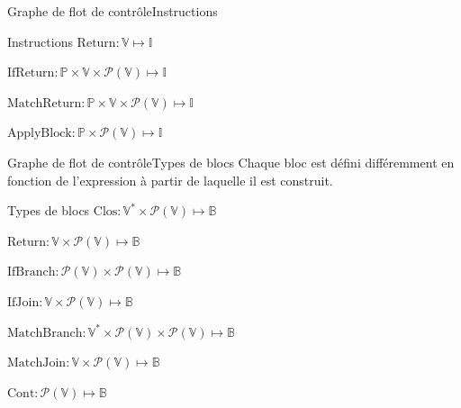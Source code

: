 \documentclass{beamer}
\begin{document}
\begin{frame}{Graphe de flot de contrôle}{Instructions}
\begin{block}{Instructions}
        $\text{Return} : \mathbb{V} \mapsto \mathbb{I}$%

        $\text{IfReturn} : \mathbb{P} \times \mathbb{V} \times \mathcal{P}(\mathbb{V}) \mapsto \mathbb{I}$%

        $\text{MatchReturn} : \mathbb{P} \times \mathbb{V} \times \mathcal{P}(\mathbb{V}) \mapsto \mathbb{I}$%

        $\text{ApplyBlock} : \mathbb{P} \times \mathcal{P}(\mathbb{V}) \mapsto \mathbb{I}$%
    \end{block}
\end{frame}

\begin{frame}{Graphe de flot de contrôle}{Types de blocs}
    Chaque bloc est défini différemment en fonction de l'expression à partir de laquelle il est construit.%
    
    \begin{block}{Types de blocs}
        $\text{Clos} : \mathbb{V}^{*} \times \mathcal{P}(\mathbb{V}) \mapsto \mathbb{B}$%

        $\text{Return} : \mathbb{V} \times \mathcal{P}(\mathbb{V}) \mapsto \mathbb{B}$%

        $\text{IfBranch} : \mathcal{P}(\mathbb{V}) \times \mathcal{P}(\mathbb{V}) \mapsto \mathbb{B}$%

        $\text{IfJoin} : \mathbb{V} \times \mathcal{P}(\mathbb{V}) \mapsto \mathbb{B}$%

        $\text{MatchBranch} : \mathbb{V}^{*} \times \mathcal{P}(\mathbb{V}) \times \mathcal{P}(\mathbb{V}) \mapsto \mathbb{B}$%

        $\text{MatchJoin} : \mathbb{V} \times \mathcal{P}(\mathbb{V}) \mapsto \mathbb{B}$%

        $\text{Cont} : \mathcal{P}(\mathbb{V}) \mapsto \mathbb{B}$%
    \end{block}
\end{frame}
\end{document}
